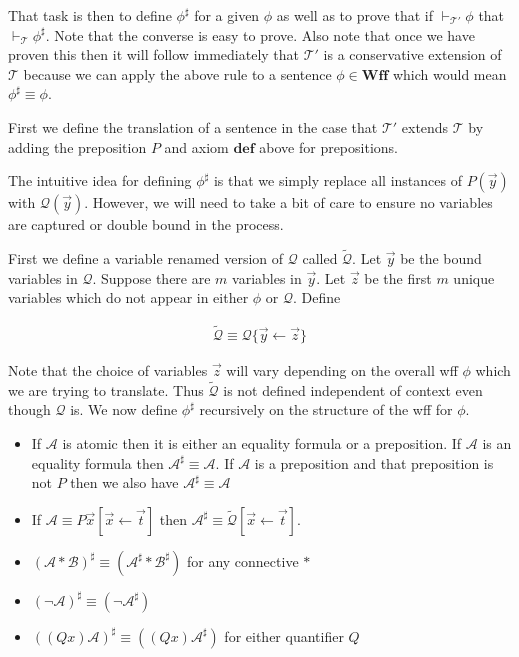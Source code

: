 \documentclass[12pt]{article}
\newcommand{\bv}[1]{\boldsymbol{#1}}
\newcommand{\mc}[1]{\mathcal{#1}}
\newcommand{\bc}[1]{\bv{\mc{#1}}}
\begin{document}
That task is then to define $\phi^{\sharp}$ for a given $\phi$ as well as to prove that if $\vdash_{\bc{T}'}\phi$ that $\vdash_{\bc{T}}\phi^{\sharp}$. Note that the converse is easy to prove. Also note that once we have proven this then it will follow immediately that $\bc{T}'$ is a conservative extension of $\bc{T}$ because we can apply the above rule to a sentence $\phi \in \textbf{Wff}$ which would mean $\phi^{\sharp} \equiv \phi$.

First we define the translation of a sentence in the case that $\bc{T}'$ extends $\bc{T}$ by adding the preposition $P$ and axiom $\textbf{def}$ above for prepositions.

The intuitive idea for defining $\phi^{\sharp}$ is that we simply replace all instances of $P(\vec{y})$ with $\mc{Q}(\vec{y})$. However, we will need to take a bit of care to ensure no variables are captured or double bound in the process.

First we define a variable renamed version of $\mc{Q}$ called $\tilde{\mc{Q}}$. Let $\vec{y}$ be the bound variables in $\mc{Q}$. Suppose there are $m$ variables in $\vec{y}$. Let $\vec{z}$ be the first $m$ unique variables which do not appear in either $\phi$ or $\mc{Q}$. Define

\begin{align}
\tilde{\mc{Q}} \equiv \mc{Q}\{\vec{y} \leftarrow \vec{z}\}
\end{align}

Note that the choice of variables $\vec{z}$ will vary depending on the overall wff $\phi$ which we are trying to translate. Thus $\tilde{\mc{Q}}$ is not defined independent of context even though $\mc{Q}$ is.
We now define $\phi^{\sharp}$ recursively on the structure of the wff for $\phi$. 


\begin{itemize}
\item{If $\mc{A}$ is atomic then it is either an equality formula or a preposition. If $\mc{A}$ is an equality formula then $\mc{A}^{\sharp} \equiv \mc{A}$. If $\mc{A}$ is a preposition and that preposition is not $P$ then we also have $\mc{A}^{\sharp} \equiv \mc{A}$}
\item{If $\mc{A} \equiv P\vec{x}[\vec{x}\leftarrow \vec{t}]$ then $\mc{A}^{\sharp} \equiv \tilde{\mc{Q}}[\vec{x}\leftarrow \vec{t}]$.}
\item{$(\mc{A}\ast \mc{B})^{\sharp} \equiv (\mc{A}^{\sharp} \ast \mc{B}^{\sharp})$ for any connective $\ast$}
\item{$(\lnot \mc{A})^{\sharp} \equiv (\lnot \mc{A}^{\sharp})$}
\item{$((Q x)\mc{A})^{\sharp} \equiv ((Q x)\mc{A}^{\sharp})$ for either quantifier $Q$}
\end{itemize}
\end{document}
